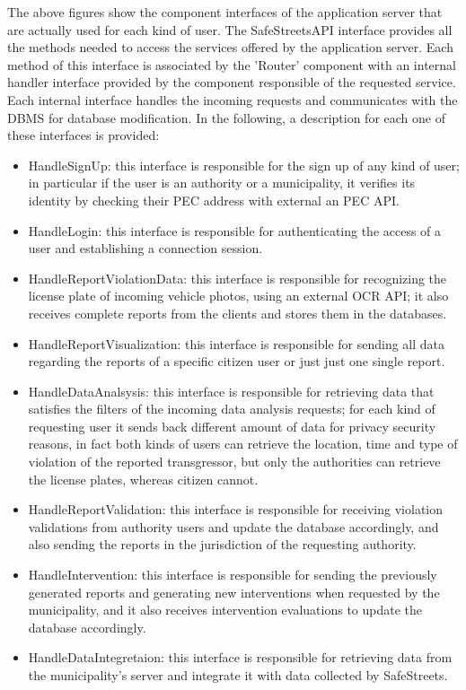 The above figures show the component interfaces of the application server that are actually used for each kind of user. The SafeStreetsAPI interface provides all the methods needed to access the services offered by the application server. Each method of this interface is associated by the 'Router' component with an internal handler interface provided by the component responsible of the requested service. Each internal interface handles the incoming requests and communicates with the DBMS for database modification. In the following, a description for each one of these interfaces is provided:
\begin{itemize}
	\item HandleSignUp: this interface is responsible for the sign up of any kind of user; in particular if the user is an authority or a municipality, it verifies its identity by checking their PEC address with external an PEC API.
	\item HandleLogin: this interface is responsible for authenticating the access of a user and establishing a connection session.
	\item HandleReportViolationData: this interface is responsible for recognizing the license plate of incoming vehicle photos, using an external OCR API; it also receives complete reports from the clients and stores them in the databases.
	\item HandleReportVisualization: this interface is responsible for sending all data regarding the reports of a specific citizen user or just just one single report.
	\item HandleDataAnalsysis: this interface is responsible for retrieving data that satisfies the filters of the incoming data analysis requests; for each kind of requesting user it sends back different amount of data for privacy security reasons, in fact both kinds of users can retrieve the location, time and type of violation of the reported transgressor, but only the authorities can retrieve the license plates, whereas citizen cannot.
	\item HandleReportValidation: this interface is responsible for receiving violation validations from authority users and update the database accordingly, and also sending the reports in the jurisdiction of the requesting authority.
	\item HandleIntervention: this interface is responsible for sending the previously generated reports and generating new interventions when requested by the municipality, and it also receives intervention evaluations to update the database accordingly.
	\item HandleDataIntegretaion: this interface is responsible for retrieving data from the municipality's server and integrate it with data collected by SafeStreets.
\end{itemize}